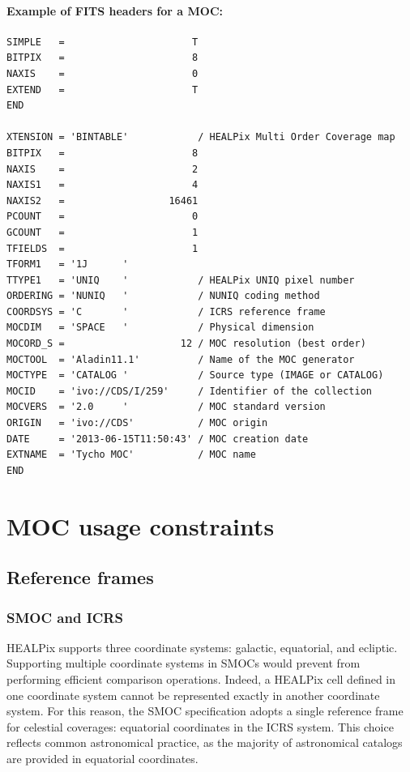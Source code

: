 \documentclass[11pt,a4paper]{ivoa}
\begin{document}
\paragraph{Example of FITS headers for a MOC:}
\par\noindent
\begin{verbatim}
SIMPLE   =                      T
BITPIX   =                      8
NAXIS    =                      0
EXTEND   =                      T
END

XTENSION = 'BINTABLE'            / HEALPix Multi Order Coverage map
BITPIX   =                      8
NAXIS    =                      2
NAXIS1   =                      4
NAXIS2   =                  16461
PCOUNT   =                      0
GCOUNT   =                      1
TFIELDS  =                      1
TFORM1   = '1J      '
TTYPE1   = 'UNIQ    '            / HEALPix UNIQ pixel number
ORDERING = 'NUNIQ   '            / NUNIQ coding method
COORDSYS = 'C       '            / ICRS reference frame
MOCDIM   = 'SPACE   '            / Physical dimension
MOCORD_S =                    12 / MOC resolution (best order)
MOCTOOL  = 'Aladin11.1'          / Name of the MOC generator
MOCTYPE  = 'CATALOG '            / Source type (IMAGE or CATALOG)
MOCID    = 'ivo://CDS/I/259'     / Identifier of the collection
MOCVERS  = '2.0     '            / MOC standard version
ORIGIN   = 'ivo://CDS'           / MOC origin
DATE     = '2013-06-15T11:50:43' / MOC creation date
EXTNAME  = 'Tycho MOC'           / MOC name
END
\end{verbatim}

\section{MOC usage constraints}

\subsection{Reference frames}

\subsubsection{SMOC and ICRS}

HEALPix supports three coordinate systems: galactic, equatorial, and ecliptic.
Supporting multiple coordinate systems in SMOCs would prevent from performing
efficient comparison operations.
Indeed, a HEALPix cell defined in one coordinate system cannot be represented
exactly in another coordinate system.
For this reason, the SMOC specification adopts a single reference frame
for celestial coverages: 
equatorial coordinates in the ICRS system.
This choice reflects common astronomical practice, as the majority of
astronomical catalogs are provided in equatorial coordinates.
\end{document}
